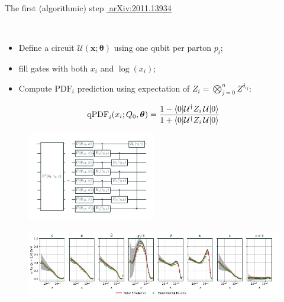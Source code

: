 \documentclass[8pt, xcolor={svgnames}, hyperref={linkcolor=black}]{beamer}
\begin{document}
\begin{frame}{The first (algorithmic) step \hfill \href{https://arxiv.org/abs/2011.13934}{\faBook\,\,arXiv:2011.13934}}
\pause
\begin{multicols}{2}
$\,$
\begin{itemize}[noitemsep]
  \item[\footnotesize\faCircle] Define a circuit $\mathcal{U}(\bm{x};\bm{\theta})$ using one qubit per parton $p_i$;
  \item[\footnotesize\faCircle] fill gates with both $x_i$ and $\log(x_i)$;
  \item[\footnotesize\faCircle] Compute $\text{PDF}_i$ prediction using expectation of $Z_i = \bigotimes_{j=0}^n Z^{\delta_{ij}}:$
\end{itemize}
$$ \text{qPDF}_i(x_i; Q_0, \bm{\theta}) = \frac{1 - \braket{0|\mathcal{U}^{\dagger} Z_i \,
\mathcal{U}| 0}}{1 + \braket{0|\mathcal{U}^{\dagger} Z_i\, \mathcal{U}| 0}}  $$
\begin{figure}  
  \includegraphics[width=0.5\textwidth]{figures/qpdf_circuit.pdf}
\end{figure}
\end{multicols}
\pause
\begin{figure}  
  \includegraphics[width=1\textwidth]{figures/qpdf.pdf}
\end{figure}
\end{frame}
\end{document}
